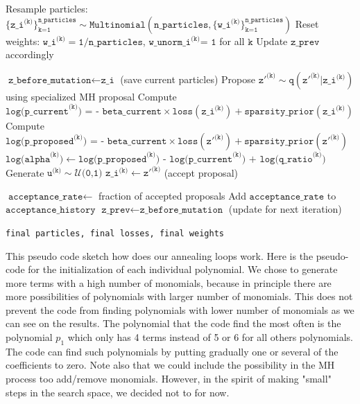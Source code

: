 \documentclass[11pt,a4paper]{article}
\begin{document}
\begin{algorithm}
\begin{algorithmic}[1]
		 
		\State Resample particles: $\{\texttt{z\_i}^{\texttt{(k)}}\}_{\texttt{k=1}}^{\texttt{n\_particles}} \sim \texttt{Multinomial}(\texttt{n\_particles}, \{\texttt{w\_i}^{\texttt{(k)}}\}_{\texttt{k=1}}^{\texttt{n\_particles}})$
		\State Reset weights: $\texttt{w\_i}^{\texttt{(k)}} = \texttt{1/n\_particles}$, $\texttt{w\_unorm\_i}^{\texttt{(k)}} \texttt{= 1}$ for all $\texttt k$
		\State Update $\texttt{z\_prev}$ accordingly
		\EndIf
		
		\State $\texttt{z\_before\_mutation} \leftarrow \texttt{z\_i}$ (save current particles)
		 
		\State Propose $\texttt{z}'^{\texttt{(k)}} \sim \texttt{q}(\texttt{z}'^{\texttt{(k)}} | \texttt{z\_i}^{\texttt{(k)}})$ using specialized MH proposal
		\State Compute $ \texttt{log(p\_current}^{\texttt{(k)}} \texttt{) = - beta\_current} \times \texttt{loss}(\texttt{z\_i}^{\texttt{(k)}}) + \texttt{sparsity\_prior}(\texttt{z\_i}^{\texttt{(k)}})$
		\State Compute $\texttt{log(p\_proposed}^{\texttt{(k)}} \texttt{) = - beta\_current} \times \texttt{loss}(\texttt{z}'^{\texttt{(k)}}) + \texttt{sparsity\_prior}(\texttt{z}'^{\texttt{(k)}})$
		\State $\texttt{log(alpha}^{\texttt{(k)}} \texttt) \leftarrow  \texttt{log(p\_proposed}^{\texttt{(k)}}  \texttt{) -  log(p\_current}^{\texttt{(k)}}  \texttt{) + log(q\_ratio}^{\texttt{(k)}}\texttt)$
		\State Generate $\texttt{u}^{\texttt{(k)}} \sim \mathcal{U}\texttt{(0,1)}$
		\State $\texttt{z\_i}^{\texttt{(k)}} \leftarrow \texttt{z}'^{\texttt{(k)}}$ (accept proposal)
		\EndIf
		\EndFor
		
		\State $\texttt{acceptance\_rate} \leftarrow$ fraction of accepted proposals
		\State Add $\texttt{acceptance\_rate}$ to $\texttt{acceptance\_history}$
		\State $\texttt{z\_prev} \leftarrow \texttt{z\_before\_mutation}$ (update for next iteration)
		
		\EndFor
		
		\Return \texttt{final particles, final losses, final weights}
	\end{algorithmic}
\end{algorithm}

This pseudo code sketch how does our annealing loops work. Here is the pseudo-code for the initialization of each individual polynomial. We chose to generate more terms with a high number of monomials, because in principle there are more possibilities of polynomials with larger number of monomials. This does not prevent the code from finding polynomials with lower number of monomials as we can see on the results. The polynomial that the code find the most often is the polynomial $p_1$ which only has 4 terms instead of 5 or 6 for all others polynomials. The code can find such polynomials by putting gradually one or several of the coefficients to zero. Note also that we could include the possibility in the MH process too add/remove monomials. However, in the spirit of making "small" steps in the search space, we decided not to for now. 
\end{document}
